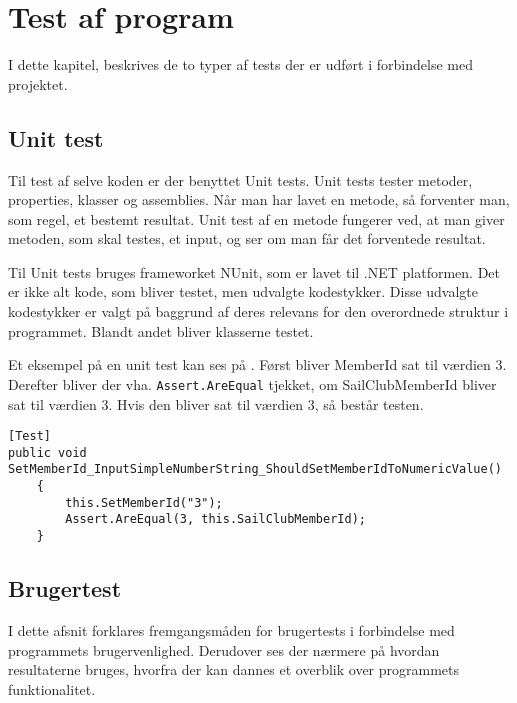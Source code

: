 \chapter{Test af program}\label{test_af_program}
I dette kapitel, beskrives de to typer af tests der er udført i forbindelse med projektet. 

\section{Unit test}
Til test af selve koden er der benyttet Unit tests.
Unit tests tester metoder, properties, klasser og assemblies. 
Når man har lavet en metode, så forventer man, som regel, et bestemt resultat. 
Unit test af en metode fungerer ved, at man giver metoden, som skal testes, et input, og ser om man får det forventede resultat.

Til Unit tests bruges frameworket NUnit, som er lavet til .NET platformen. 
Det er ikke alt kode, som bliver testet, men udvalgte kodestykker.
Disse udvalgte kodestykker er valgt på baggrund af deres relevans for den overordnede struktur i programmet. 
Blandt andet bliver klasserne testet. 

Et eksempel på en unit test kan ses på .
Først bliver MemberId sat til værdien 3. 
Derefter bliver der vha. \texttt{Assert.AreEqual} tjekket, om SailClubMemberId bliver sat til værdien 3.
Hvis den bliver sat til værdien 3, så består testen.

\begin{lstlisting}[frame=single, caption=Eksempel på Unit test, label=unit_test]
[Test]
public void SetMemberId_InputSimpleNumberString_ShouldSetMemberIdToNumericValue()
	{
		this.SetMemberId("3");
		Assert.AreEqual(3, this.SailClubMemberId);
	}
\end{lstlisting}

\section{Brugertest}
I dette afsnit forklares fremgangsmåden for brugertests i forbindelse med programmets brugervenlighed.
Derudover ses der nærmere på hvordan resultaterne bruges, hvorfra der kan dannes et overblik over programmets funktionalitet. 

